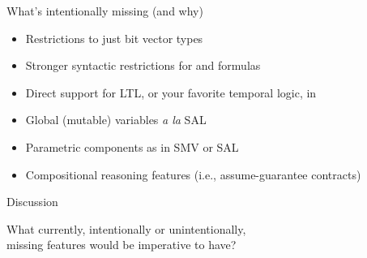 \documentclass[10pt,aspectratio=149]{beamer}
\begin{document}

\begin{frame}{What's intentionally missing (and why)}
\smallskip

\begin{itemize}
\item
Restrictions to just bit vector types \\[.5ex]
\smallskip

\item
Stronger syntactic restrictions for \inita and \transa formulas \\[.5ex]
\smallskip

\item
Direct support for LTL, or your favorite temporal logic, in \checksys \\[.5ex]
\smallskip

\item
Global (mutable) variables \emph{a la} SAL \\[.5ex]
\smallskip

\item
Parametric components as in SMV or SAL \\[.5ex] 
\smallskip

\item
Compositional reasoning features
(i.e., assume-guarantee contracts) \\[.5ex]
\smallskip

\end{itemize}

\end{frame}


\begin{frame}{Discussion}
\Large
\centering

What currently, intentionally or unintentionally, \\[.4ex]
missing features would be imperative to have?

\end{frame}
\end{document}
